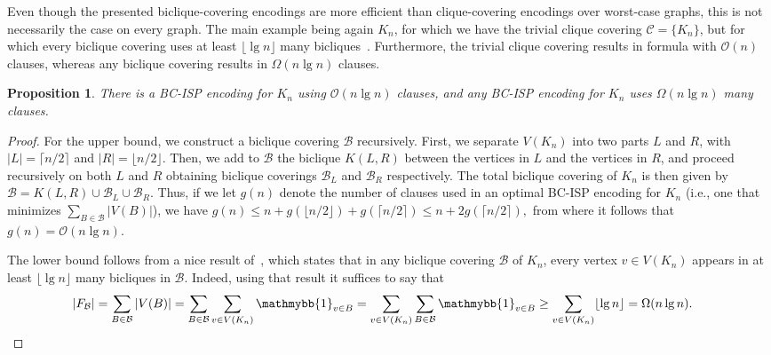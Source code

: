 \documentclass[11pt]{article}
\newtheorem{proposition}[theorem]{Proposition}
\renewcommand{\O}{\mathcal{O}}
\begin{document}
Even though the presented biclique-covering encodings are more efficient than clique-covering encodings over worst-case graphs, this is not necessarily the case on every graph. The main example being again $K_n$, for which we have the trivial clique covering $\mathcal{C} = \{K_n\}$, but for which
every biclique covering uses at least $\lfloor \lg n \rfloor$ many bicliques~\cite{fishburnBipartiteDimensionsBipartite1996}. Furthermore, the trivial clique covering results in formula with $\O(n)$ clauses, whereas any biclique covering results in $\Omega(n \lg n)$ clauses.
\begin{proposition}
    There is a BC-ISP encoding for $K_n$ using $\O(n \lg n)$ clauses, and any BC-ISP encoding for $K_n$ uses $\Omega(n \lg n)$ many clauses.
\end{proposition}
\begin{proof}
For the upper bound, we construct a biclique covering $\mathcal{B}$ recursively. First, we separate $V(K_n)$ into two parts $L$ and $R$, with $|L| = \lceil n / 2\rceil$ and $|R| = \lfloor n/2 \rfloor$. Then, we add to $\mathcal{B}$ the biclique $K(L, R)$ between the vertices in $L$ and the vertices in $R$, and proceed recursively on both $L$ and $R$ obtaining biclique coverings $\mathcal{B}_L$ and $\mathcal{B}_R$ respectively. The total biclique covering of $K_n$ is then given by 
\(
\mathcal{B} = K(L, R) \cup \mathcal{B}_L \cup \mathcal{B}_R.
\)
Thus, if we let $g(n)$
denote the number of clauses used in an optimal BC-ISP encoding for $K_n$ (i.e., one that minimizes $\sum_{B \in \mathcal{B}} |V(B)|$), we have 
\(
    g(n) \leq n + g(\lfloor n/2 \rfloor) + g(\lceil n/2 \rceil) \leq n + 2 g(\lceil n/2\rceil),
\)
from where it follows that $g(n) = \O(n \lg n)$.

The lower bound follows from a nice result of~\citet{dongDecompositionGraphsComplete2007}, which states that 
in any biclique covering $\mathcal{B}$ of $K_n$, every vertex $v \in V(K_n)$ appears in at least $\lfloor \lg n \rfloor$ many bicliques in $\mathcal{B}$. Indeed, using that result it suffices to say that 
\begin{align*}
|F_\mathcal{B}| &= \sum_{B \in \mathcal{B}} |V(B)| = \sum_{B \in \mathcal{B}} \sum_{v \in V(K_n)} \mathmybb{1}_{v \in B}
 = \sum_{v \in V(K_n)} \sum_{B \in \mathcal{B}} \mathmybb{1}_{v \in B}  \geq \sum_{v \in V(K_n)} \lfloor \lg n \rfloor = \Omega(n \lg n). \qedhere
\end{align*}
\end{proof}
\end{document}

